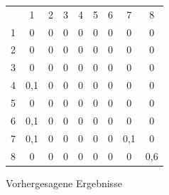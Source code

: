 \documentclass[12pt,a4paper,bibliography=totocnumbered,listof=totocnumbered]{article}
\begin{document}
\begin{figure} [h]
\begin{minipage}[b]{0.4\textwidth}
\end{minipage}
\qquad
\begin{minipage}[b]{0.4\textwidth}
\centering
   \begin{tabular}{ccccccccc}
                       & 1                        & 2                      & 3                      & 4                      & 5                      & 6                      & 7                        & 8                        \\ \cline{2-9} 
\multicolumn{1}{c|}{1} & \multicolumn{1}{c|}{0}   & \multicolumn{1}{c|}{0} & \multicolumn{1}{c|}{0} & \multicolumn{1}{c|}{0} & \multicolumn{1}{c|}{0} & \multicolumn{1}{c|}{0} & \multicolumn{1}{c|}{0}   & \multicolumn{1}{c|}{0}   \\ \cline{2-9} 
\multicolumn{1}{c|}{2} & \multicolumn{1}{c|}{0}   & \multicolumn{1}{c|}{0} & \multicolumn{1}{c|}{0} & \multicolumn{1}{c|}{0} & \multicolumn{1}{c|}{0} & \multicolumn{1}{c|}{0} & \multicolumn{1}{c|}{0}   & \multicolumn{1}{c|}{0}   \\ \cline{2-9} 
\multicolumn{1}{c|}{3} & \multicolumn{1}{c|}{0}   & \multicolumn{1}{c|}{0} & \multicolumn{1}{c|}{0} & \multicolumn{1}{c|}{0} & \multicolumn{1}{c|}{0} & \multicolumn{1}{c|}{0} & \multicolumn{1}{c|}{0}   & \multicolumn{1}{c|}{0}   \\ \cline{2-9} 
\multicolumn{1}{c|}{4} & \multicolumn{1}{c|}{0,1} & \multicolumn{1}{c|}{0} & \multicolumn{1}{c|}{0} & \multicolumn{1}{c|}{0} & \multicolumn{1}{c|}{0} & \multicolumn{1}{c|}{0} & \multicolumn{1}{c|}{0}   & \multicolumn{1}{c|}{0}   \\ \cline{2-9} 
\multicolumn{1}{c|}{5} & \multicolumn{1}{c|}{0}   & \multicolumn{1}{c|}{0} & \multicolumn{1}{c|}{0} & \multicolumn{1}{c|}{0} & \multicolumn{1}{c|}{0} & \multicolumn{1}{c|}{0} & \multicolumn{1}{c|}{0}   & \multicolumn{1}{c|}{0}   \\ \cline{2-9} 
\multicolumn{1}{c|}{6} & \multicolumn{1}{c|}{0,1} & \multicolumn{1}{c|}{0} & \multicolumn{1}{c|}{0} & \multicolumn{1}{c|}{0} & \multicolumn{1}{c|}{0} & \multicolumn{1}{c|}{0} & \multicolumn{1}{c|}{0}   & \multicolumn{1}{c|}{0}   \\ \cline{2-9} 
\multicolumn{1}{c|}{7} & \multicolumn{1}{c|}{0,1} & \multicolumn{1}{c|}{0} & \multicolumn{1}{c|}{0} & \multicolumn{1}{c|}{0} & \multicolumn{1}{c|}{0} & \multicolumn{1}{c|}{0} & \multicolumn{1}{c|}{0,1} & \multicolumn{1}{c|}{0}   \\ \cline{2-9} 
\multicolumn{1}{c|}{8} & \multicolumn{1}{c|}{0}   & \multicolumn{1}{c|}{0} & \multicolumn{1}{c|}{0} & \multicolumn{1}{c|}{0} & \multicolumn{1}{c|}{0} & \multicolumn{1}{c|}{0} & \multicolumn{1}{c|}{0}   & \multicolumn{1}{c|}{0,6} \\ \cline{2-9} 
\end{tabular}
    \label{abb:nn-erg-policy}

\end{minipage}
\caption{Vorhergesagene Ergebnisse}

\label{abb:nn-erg}
\end{figure}
\end{document}

